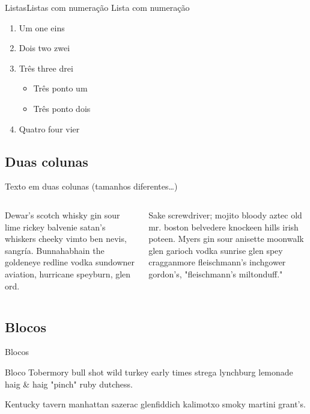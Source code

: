 \documentclass[
	brazilian, %
	12pt, %
]{beamer}
\begin{document}
\begin{frame}{Listas}{Listas com numeração}
	Lista com numeração
	
	\begin{enumerate}
		\item Um one eins
		\item Dois two zwei
		\item Três three drei
			\begin{itemize}
				\item Três ponto um
				\item Três ponto dois
			\end{itemize}
		\item Quatro four vier
	\end{enumerate}
\end{frame}

\subsection{Duas colunas}

\begin{frame}
	Texto em duas colunas (tamanhos diferentes\ldots)
	
	\begin{columns}
		\begin{column}{0.4\linewidth}
			Dewar's scotch whisky gin sour lime rickey balvenie satan's whiskers cheeky vimto ben nevis, sangría. Bunnahabhain the goldeneye redline vodka sundowner aviation, hurricane speyburn, glen ord.
		\end{column}
		\begin{column}{0.6\linewidth}
			 Sake screwdriver; mojito bloody aztec old mr. boston belvedere knockeen hills irish poteen. Myers gin sour anisette moonwalk glen garioch vodka sunrise glen spey cragganmore fleischmann's inchgower gordon's, "fleischmann's miltonduff." 
		\end{column}
	\end{columns}
\end{frame}

\subsection{Blocos}

\begin{frame}{Blocos}
	\begin{block}{Bloco}
		Tobermory bull shot wild turkey early times strega lynchburg lemonade haig \& haig "pinch" ruby dutchess. 
	\end{block}

	\begin{definition}
		Kentucky tavern manhattan sazerac glenfiddich kalimotxo smoky martini grant's.
	\end{definition}

\end{frame}
\end{document}
